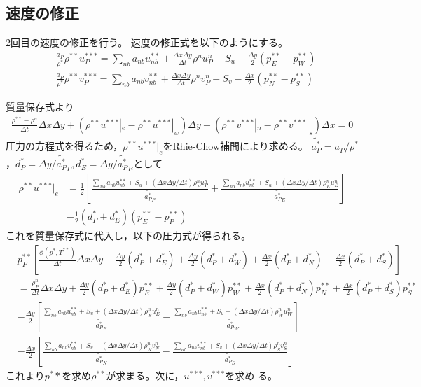 \documentclass[a4paper,10pt,fleqn,dvipdfmx]{jsarticle}
\begin{document}
\subsection{速度の修正}
2回目の速度の修正を行う。
速度の修正式を以下のようにする。
\begin{align}
 &\frac{a_P}{\rho^*} \rho^{**} u_P^{***} 
= \sum_{nb} a_{nb} u_{nb}^{**} + \frac{\Delta x \Delta y}{\Delta t}\rho^n u_P^n
 +S_u - \frac{\Delta y}{2}(p_E^{**} - p_W^{**})\\
 &\frac{a_P}{\rho^*}\rho^{**} v_P^{***} 
= \sum_{nb} a_{nb} v_{nb}^{**} + \frac{\Delta x \Delta y}{\Delta t}\rho^n v_P^n
 +S_v  - \frac{\Delta x}{2}(p_N^{**} - p_S^{**})
\end{align}

質量保存式より
\begin{align}
 \frac{\rho^{**} - \rho^n}{\Delta t} \Delta x \Delta y 
+ \left(\rho^{**} u^{***}|_e - \rho^{**} u^{***}|_w\right)\Delta y 
+ \left(\rho^{**} v^{***}|_n - \rho^{**} v^{***}|_s\right) \Delta x = 0   
\end{align}
圧力の方程式を得るため，$\rho^{**}u^{***}|_e$をRhie-Chow補間により求める。
$\widetilde{a_P^*}=a_P/\rho^{*}$，$d_P^*=\Delta y/\widetilde{a_P^*}_P,
d_E^*=\Delta y/\widetilde{a_P^*}_E$として
\begin{align}
 \rho^{**}u^{***}|_e&=\frac{1}{2}\left[\frac{\sum_{nb}a_{nb}u^{**}_{nb}
 +S_u +(\Delta x\Delta y/\Delta t)\rho^n_P u_P^n}{\widetilde{a_P^*}_P} 
+ \frac{\sum_{nb}a_{nb}u^{**}_{nb}
 +S_u + (\Delta x\Delta y/\Delta t)\rho^n_E
 u_E^n}{\widetilde{a_P^*}_E}\right] \nonumber \\
& - \frac{1}{2}(d_P^*+d_E^*)(p_E^{**}-p_P^{**})
\end{align}
%
これを質量保存式に代入し，以下の圧力式が得られる。
\begin{align}
 & p_P^{**}\left[\frac{\phi(p^*,T^{**})}{\Delta t}\Delta x\Delta y + \frac{\Delta y}{2}(d_P^*+d_E^*)
 + \frac{\Delta y}{2}(d_P^*+d_W^*) + \frac{\Delta x}{2}(d_P^*+d_N^*) +
 \frac{\Delta x}{2}(d_P^*+d_S^*)\right] \nonumber \\
& =  \frac{\rho_P^n}{\Delta t}\Delta x\Delta y+ \frac{\Delta y}{2}(d_P^*+d_E^*)p_E^{**} + \frac{\Delta
 y}{2}(d_P^*+d_W^*)p_W^{**} +  \frac{\Delta x}{2}(d_P^*+d_N^*)p^{**}_N +
 \frac{\Delta x}{2}(d_P^*+d_S^*)p_S^{**} \nonumber \\
& -\frac{\Delta y}{2} \left[\frac{\sum_{nb}a_{nb}u^{**}_{nb}
 +S_u +(\Delta x\Delta y/\Delta t)\rho^n_E u_E^n}{\widetilde{a_P^*}_E} 
- \frac{\sum_{nb}a_{nb}u^{**}_{nb}
 +S_u + (\Delta x\Delta y/\Delta t)\rho^n_W
 u_W^n}{\widetilde{a_P^*}_W}\right] \nonumber \\
& -\frac{\Delta x}{2} \left[\frac{\sum_{nb}a_{nb}v^{**}_{nb}
 +S_v +(\Delta x\Delta y/\Delta t)\rho^n_N v_N^n}{\widetilde{a_P^*}_N} 
- \frac{\sum_{nb}a_{nb}v^{**}_{nb}
 +S_v + (\Delta x\Delta y/\Delta t)\rho^n_S
 v_S^n}{\widetilde{a_P^*}_S}\right] 
\end{align}
%
これより$p^**$を求め$\rho^{**}$が求まる。次に，$u^{***}, v^{***}$を求め
る。
\end{document}
